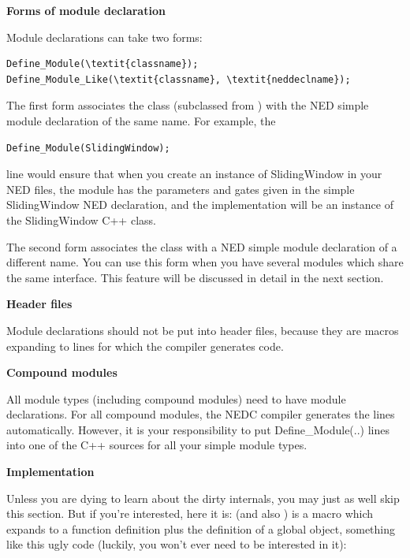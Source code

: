 \textbf{Forms of module declaration}


Module declarations can take two forms:

\begin{Verbatim}[commandchars=\\\{\}]
Define_Module(\textit{classname}); 
Define_Module_Like(\textit{classname}, \textit{neddeclname});
\end{Verbatim}
  
The first form associates the class (subclassed from
) with the NED simple
module declaration of the same name. For example, the

\begin{Verbatim}
Define_Module(SlidingWindow);
\end{Verbatim}

line would ensure that when you create an instance of SlidingWindow in
your NED files, the module has the parameters and gates given in the
simple SlidingWindow NED declaration, and the implementation will be
an instance of the SlidingWindow C++ class.


The second form associates the class with a NED
simple module declaration of a different name.
You can use this form when you have several modules which share the
same interface. This feature will be discussed in detail in the next
section.


\textbf{Header files}


Module declarations should not be put into header files, because they are macros expanding to lines for which the
compiler generates code.


\textbf{Compound modules}

All module types (including compound modules)
need to have module declarations. For all
compound modules, the NEDC compiler generates the
 lines automatically.
However, it is your responsibility to put Define\_Module(..) lines into
one of the C++ sources for all your simple module types.


\textbf{Implementation}


Unless you are dying to learn about the dirty internals, you may just
as well skip this section. But if you're interested, here it is:
 (and also ) is a
macro which expands to a function definition plus the definition of a
global object, something like this ugly code (luckily, you won't ever
need to be interested in it):

